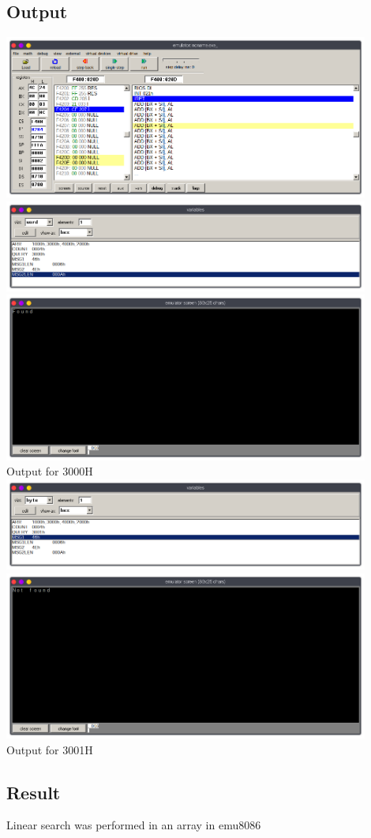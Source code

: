 \subsection{Output}
\begin{center}
	\includegraphics[width=0.90\textwidth]{img/p11/ss1.png}
	\includegraphics[width=0.90\textwidth]{img/p11/ss2.png}
	\includegraphics[width=0.90\textwidth]{img/p11/ss3.png}\\
  Output for 3000H\\
  \includegraphics[width=0.90\textwidth]{img/p11/ss4.png}
	\includegraphics[width=0.90\textwidth]{img/p11/ss5.png}\\
  Output for 3001H
\end{center}

\subsection{Result}
Linear search was performed in an array in emu8086
